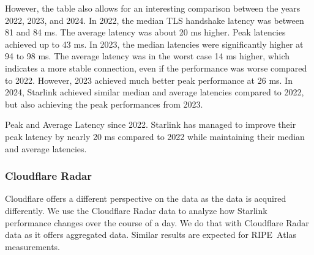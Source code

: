 However, the table also allows for an interesting comparison between the years
2022, 2023, and 2024. In 2022, the median TLS handshake latency was between 81
and 84 ms. The average latency was about 20 ms higher. Peak latencies achieved
up to 43 ms. In 2023, the median latencies were significantly higher at 94 to
98 ms. The average latency was in the worst case 14 ms higher, which indicates
a more stable connection, even if the performance was worse compared to 2022.
However, 2023 achieved much better peak performance at 26 ms. In 2024, Starlink
achieved similar median and average latencies compared to 2022, but also
achieving the peak performances from 2023.

\begin{takeaway}{Peak and Average Latency since 2022.}
	Starlink has managed to improve their peak latency by nearly 20 ms
	compared to 2022 while maintaining their median and average latencies.
\end{takeaway}

\subsubsection*{Cloudflare Radar}

Cloudflare offers a different perspective on the data as the data is acquired
differently. We use the Cloudflare Radar data to analyze how Starlink
performance changes over the course of a day. We do that with Cloudflare Radar
data as it offers aggregated data. Similar results are expected for RIPE~Atlas
measurements.



